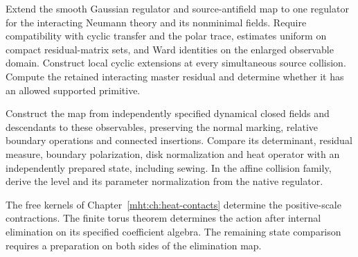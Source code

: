 \begin{problem}
\label{mht:qn:native-quantum-elimination}
Extend the smooth Gaussian regulator and source-antifield map to
one regulator for the interacting Neumann theory and its nonminimal
fields. Require compatibility with cyclic transfer and the polar
trace, estimates uniform on compact residual-matrix sets, and
Ward identities on the enlarged observable domain. Construct local
cyclic extensions at every simultaneous source collision.
Compute the retained interacting master residual and determine
whether it has an allowed supported primitive.

Construct the map from independently specified dynamical closed
fields and descendants to these observables, preserving the normal
marking, relative boundary operations and connected insertions.
Compare its determinant, residual measure, boundary polarization,
disk normalization and heat operator with an independently prepared
state, including sewing. In the affine collision family, derive the
level and its parameter normalization from the native regulator.
\end{problem}

The free kernels of Chapter~\ref{mht:ch:heat-contacts} determine the
positive-scale contractions. The finite torus theorem determines
the action after internal elimination on its specified coefficient
algebra. The remaining state comparison requires a preparation on
both sides of the elimination map.
